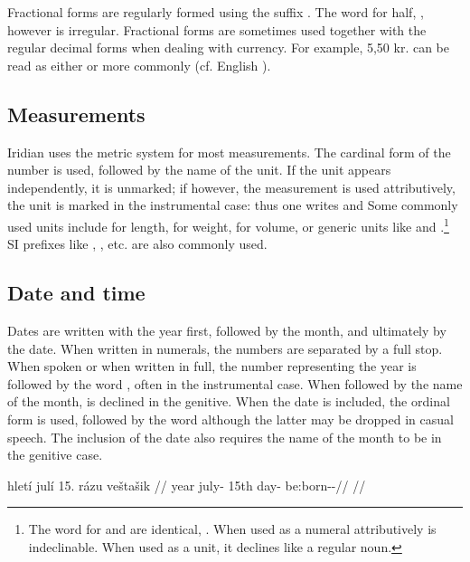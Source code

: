 Fractional forms are regularly formed using the suffix . The word
for half, , however is irregular. Fractional forms are sometimes used
together with the regular decimal forms when dealing with currency. For example,
5,50 kr. can be read as either  or more commonly
 (cf. English ).

\subsection{Measurements}\label{sec:measurements}

Iridian uses the metric system for most measurements. The cardinal form of the
number is used, followed by the name of the unit. If the unit appears
independently, it is unmarked; if however, the measurement is used
attributively, the unit is marked in the instrumental case: thus one writes
 and  Some commonly used units include  for length,
 for weight,  for volume, or generic units
like    and
.\footnote{The word for  and  are
identical, . When used as a numeral attributively  is
indeclinable. When used as a unit, it declines like a regular noun.} SI prefixes
like , , etc. are also commonly used.

\subsection{Date and time}\label{sec:date-time}

Dates are written with the year first, followed by the month, and ultimately by
the date. When written in numerals, the numbers are separated by a full stop.
When spoken or when written in full, the number representing the year is
followed by the word , often in the instrumental case. When
followed by the name of the month,  is declined in the genitive. When
the date is included, the ordinal form is used, followed by the word
 although the latter may be dropped in casual speech. The
inclusion of the date also requires the name of the month to be in the genitive
case.

\pex
\a
\begingl
     hletí julí 15. rázu veštašik //
     year july-\Gen{} 15th day-\Ins{} be:born-\Av{}-\Pf{}//
    \glft {}//
\endgl
\xe

